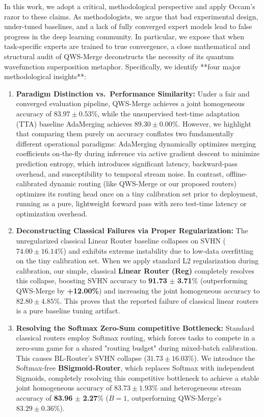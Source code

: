 In this work, we adopt a critical, methodological perspective and apply Occam's razor to these claims. As methodologists, we argue that bad experimental design, under-tuned baselines, and a lack of fully converged expert models lead to false progress in the deep learning community. In particular, we expose that when task-specific experts are trained to true convergence, a close mathematical and structural audit of QWS-Merge deconstructs the necessity of its quantum wavefunction superposition metaphor. Specifically, we identify **four major methodological insights**:
\begin{enumerate}
    \item \textbf{Paradigm Distinction vs.\ Performance Similarity:} Under a fair and converged evaluation pipeline, QWS-Merge achieves a joint homogeneous accuracy of $83.97 \pm 0.53$\%, while the unsupervised test-time adaptation (TTA) baseline AdaMerging achieves $89.30 \pm 0.00$\%. However, we highlight that comparing them purely on accuracy conflates two fundamentally different operational paradigms: AdaMerging dynamically optimizes merging coefficients on-the-fly during inference via active gradient descent to minimize prediction entropy, which introduces significant latency, backward-pass overhead, and susceptibility to temporal stream noise. In contrast, offline-calibrated dynamic routing (like QWS-Merge or our proposed routers) optimizes its routing head once on a tiny calibration set prior to deployment, running as a pure, lightweight forward pass with zero test-time latency or optimization overhead.
    \item \textbf{Deconstructing Classical Failures via Proper Regularization:} The unregularized classical Linear Router baseline collapses on SVHN ($74.00 \pm 16.14$\%) and exhibits extreme instability due to low-data overfitting on the tiny calibration set. When we apply standard L2 regularization during calibration, our simple, classical \textbf{Linear Router (Reg)} completely resolves this collapse, boosting SVHN accuracy to \textbf{91.73} $\pm$ \textbf{3.71}\% (outperforming QWS-Merge by \textbf{+12.00\%}) and increasing the joint homogeneous accuracy to $82.80 \pm 4.85$\%. This proves that the reported failure of classical linear routers is a pure baseline tuning artifact.
    \item \textbf{Resolving the Softmax Zero-Sum competitive Bottleneck:} Standard classical routers employ Softmax routing, which forces tasks to compete in a zero-sum game for a shared "routing budget" during mixed-batch calibration. This causes BL-Router's SVHN collapse ($31.73 \pm 16.03$\%). We introduce the Softmax-free \textbf{BSigmoid-Router}, which replaces Softmax with independent Sigmoids, completely resolving this competitive bottleneck to achieve a stable joint homogeneous accuracy of $83.73 \pm 1.93$\% and heterogeneous stream accuracy of \textbf{83.96} $\pm$ \textbf{2.27}\% ($B=1$, outperforming QWS-Merge's $83.29 \pm 0.36$\%).

\end{enumerate}
